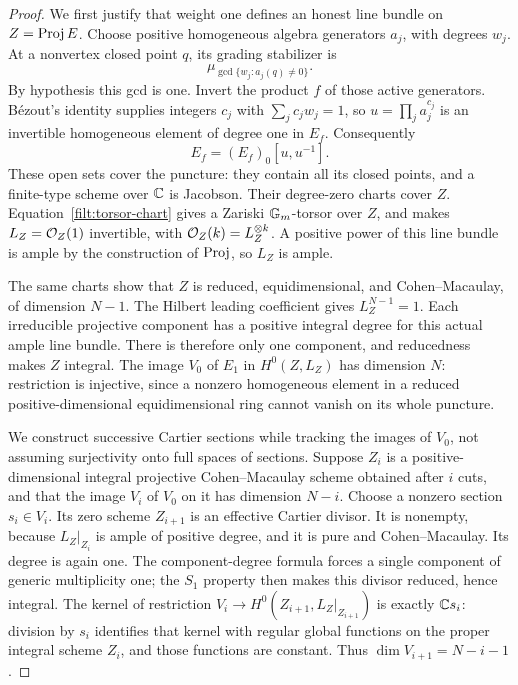 \begin{proof}
We first justify that weight one defines an honest line bundle on
$Z=\operatorname{Proj} E$.  Choose positive homogeneous algebra generators $a_j$,
with degrees $w_j$.  At a nonvertex closed point $q$, its grading
stabilizer is
\[
 \mu_{\gcd\{w_j:a_j(q)\ne0\}}.
\]
By hypothesis this gcd is one.  Invert the product $f$ of those active
generators.  B\'ezout's identity supplies integers $c_j$ with
$\sum_j c_jw_j=1$, so $u=\prod_j a_j^{c_j}$ is an invertible homogeneous
element of degree one in $E_f$.  Consequently
\begin{equation}\label{filt:torsor-chart}
 E_f=(E_f)_0[u,u^{-1}].
\end{equation}
These open sets cover the puncture: they contain all its closed points,
and a finite-type scheme over $\mathbb C$ is Jacobson.  Their degree-zero
charts cover $Z$.  Equation~\eqref{filt:torsor-chart} gives a Zariski
$\mathbb G_m$-torsor over $Z$, and makes $L_Z=\mathcal O_Z(1)$ invertible, with
$\mathcal O_Z(k)=L_Z^{\otimes k}$.  A positive power of this line bundle is
ample by the construction of $\operatorname{Proj}$, so $L_Z$ is ample.

The same charts show that $Z$ is reduced, equidimensional, and
Cohen--Macaulay, of dimension $N-1$.  The Hilbert leading coefficient
gives $L_Z^{N-1}=1$.  Each irreducible projective component has a
positive integral degree for this actual ample line bundle.  There is
therefore only one component, and reducedness makes $Z$ integral.
The image $V_0$ of $E_1$ in $H^0(Z,L_Z)$ has dimension $N$: restriction
is injective, since a nonzero homogeneous element in a reduced
positive-dimensional equidimensional ring cannot vanish on its whole
puncture.

We construct successive Cartier sections while tracking the images of
$V_0$, not assuming surjectivity onto full spaces of sections.  Suppose
$Z_i$ is a positive-dimensional integral projective Cohen--Macaulay
scheme obtained after $i$ cuts, and that the image $V_i$ of $V_0$ on it
has dimension $N-i$.  Choose a nonzero section $s_i\in V_i$.  Its zero
scheme $Z_{i+1}$ is an effective Cartier divisor.  It is nonempty,
because $L_Z|_{Z_i}$ is ample of positive degree, and it is pure and
Cohen--Macaulay.  Its degree is again one.  The component-degree formula
forces a single component of generic multiplicity one; the $S_1$
property then makes this divisor reduced, hence integral.  The kernel
of restriction $V_i\to H^0(Z_{i+1},L_Z|_{Z_{i+1}})$ is exactly
$\mathbb C s_i$: division by $s_i$ identifies that kernel with regular global
functions on the proper integral scheme $Z_i$, and those functions are
constant.  Thus $\dim V_{i+1}=N-i-1$.


\end{proof}
